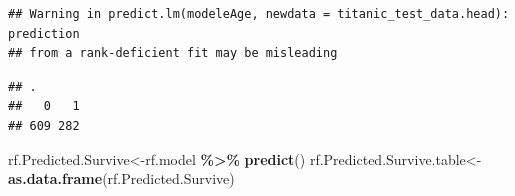 \documentclass[
]{article}
\newenvironment{Shaded}{\begin{snugshade}}{\end{snugshade}}
\newcommand{\AttributeTok}[1]{\textcolor[rgb]{0.13,0.29,0.53}{#1}}
\newcommand{\FunctionTok}[1]{\textcolor[rgb]{0.13,0.29,0.53}{\textbf{#1}}}
\newcommand{\NormalTok}[1]{#1}
\newcommand{\OtherTok}[1]{\textcolor[rgb]{0.56,0.35,0.01}{#1}}
\newcommand{\SpecialCharTok}[1]{\textcolor[rgb]{0.81,0.36,0.00}{\textbf{#1}}}
\begin{document}
\begin{verbatim}
## Warning in predict.lm(modeleAge, newdata = titanic_test_data.head): prediction
## from a rank-deficient fit may be misleading
\end{verbatim}

\begin{Shaded}
\end{Shaded}

\begin{verbatim}
## .
##   0   1 
## 609 282
\end{verbatim}

\begin{Shaded}
\begin{Highlighting}[]
\NormalTok{rf.Predicted.Survive}\OtherTok{\textless{}{-}}\NormalTok{rf.model }\SpecialCharTok{\%\textgreater{}\%}
  \FunctionTok{predict}\NormalTok{()}
\NormalTok{rf.Predicted.Survive.table}\OtherTok{\textless{}{-}}\FunctionTok{as.data.frame}\NormalTok{(rf.Predicted.Survive)}
\end{Highlighting}
\end{Shaded}
\end{document}
